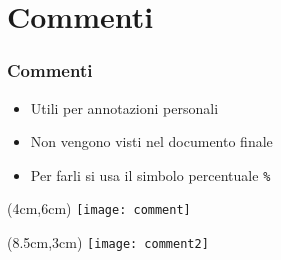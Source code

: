 \section{Commenti}
\begin{frame}
 \frametitle{Commenti}
 \begin{itemize}
  \item<1-> Utili per annotazioni personali
  \item<2-> Non vengono visti nel documento finale
  \item<3-> Per farli si usa il simbolo percentuale \texttt{\%}
 \end{itemize}
 
 \begin{textblock*}{5cm}(4cm,6cm)
   \texttt{[image: comment]}
 \end{textblock*}

 \begin{textblock*}{5cm}(8.5cm,3cm)
   \texttt{[image: comment2]}
 \end{textblock*}
 
\end{frame}
